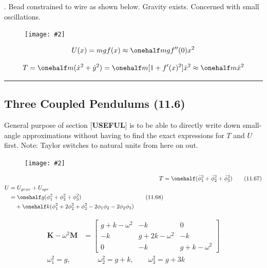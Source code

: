\documentclass[10pt, twocolumn]{article}
\newcommand\myfig[2][0.3\textwidth]{\begin{figure}[h!]\centering\texttt{[image: \#2]}\end{figure}}
\newcommand{\myspace}{\vspace{3\bigskipamount}}
\newcommand\p{\Needspace{10\baselineskip} \noindent}
\newcommand\tlab[1]{\tag{#1}\label{#1}}
\begin{document}
\myspace
\p {}. Bead constrained to wire as shown below. Gravity exists. Concerned with small oscillations.
\myfig[0.2\textwidth]{BeadWire.PNG}

$$ U(x) = mgf(x) \approx \onehalf m g f''(0) x^2 $$

$$ T = \onehalf m (\dot x^2 + \dot y^2) = \onehalf m [1 + f'(x)^2]\dot x^2 \approx \onehalf m \dot x^2 $$

\myspace
{}
\hrule
\subsection{Three Coupled Pendulums (11.6)}

\p General purpose of section [\textbf{USEFUL}] is to be able to directly write down small-angle approximations without having to find the exact expressions for $T$ and $U$ first. Note: Taylor switches to natural units from here on out. 
\myfig[0.3\textwidth]{CoupledPend.PNG}

\p {}
\begin{align}
	T &= \onehalf (\dot{\phi}_1^2 + \dot{\phi}_2^2 + \dot{\phi}_3^2) \tlab{11.67} \\
	\begin{split}
	U &= U_{grav} + U_{spr} \\
	&= \onehalf g ( \phi_1^2 + \phi_2^2 + \phi_3^2) \\
	&\quad + \onehalf k( \phi_1^2 + 2\phi_2^2 + \phi_3^2  - 2\phi_1\phi_2 - 2\phi_2\phi_3) 
	\end{split}\tlab{11.68}
\end{align}

\p {}

\begin{align}
	\mathbf K - \omega^2 \mathbf M &= 
	\begin{bmatrix}
	g + k - \omega^2 & -k & 0 \\
	-k & g + 2k - \omega^2 & -k \\
	0 & -k & g + k - \omega^2 
	\end{bmatrix}\tlab{11.72}\\
	\omega_1^2 = g, &\qquad \omega_2^2 = g + k, \qquad \omega_3^2 = g + 3k\tlab{11.73}
\end{align}
\end{document}
